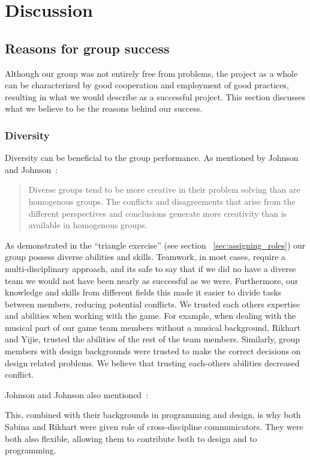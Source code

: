 \chapter{Discussion} \label{chap:discussion}
\section{Reasons for group success}
Although our group was not entirely free from problems, the project as a whole can be characterized by good cooperation and employment of good practices, resulting in what we would describe as a successful project. This section discusses what we believe to be the reasons behind our success.
\subsection{Diversity}
Diversity can be beneficial to the group performance. As mentioned by Johnson and Johnson~\cite[p. 445]{2013johnson}:
\begin{quote}
Diverse groups tend to be more creative in their problem solving than are homogenous groups. The conflicts and disagreements that arise from the different perspectives and conclusions generate more creativity than is available in homogenous groups.
\end{quote}

As demonstrated in the “triangle exercise” (see section ~\ref{sec:assigning_roles}) our group possess diverse abilities and skills. Teamwork, in most cases, require a multi-disciplinary approach, and its safe to say that if we did no have a diverse team we would not have been nearly as successful as we were. Furthermore, our knowledge and skills from different fields this made it easier to divide tasks between members, reducing potential conflicts. We trusted each others expertise and abilities when working with the game. For example, when dealing with the musical part of our game team members without a musical background, Rikhart and Yijie, trusted the abilities of the rest of the team members. Similarly, group members with design backgrounds were trusted to make the correct decisions on design related problems. We believe that trusting each-others abilities decreased conflict.  

Johnson and Johnson also mentioned~\cite[p. 446]{2013johnson}:
\begin{quote}
\end{quote} 
This, combined with their backgrounds in programming and design, is why both Sabina and Rikhart were given role of cross-discipline communicators. They were both also flexible, allowing them to contribute both to design and to programming.

